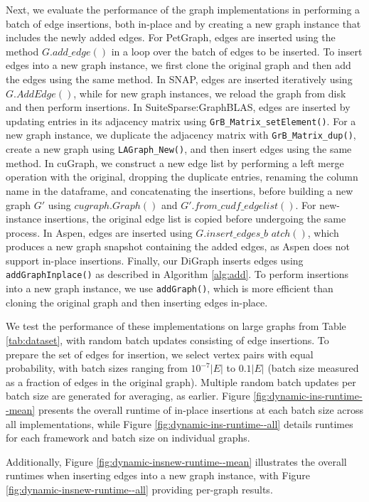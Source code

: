 Next, we evaluate the performance of the graph implementations in performing a batch of edge insertions, both in-place and by creating a new graph instance that includes the newly added edges. For PetGraph, edges are inserted using the method $G.add\_edge()$ in a loop over the batch of edges to be inserted. To insert edges into a new graph instance, we first clone the original graph and then add the edges using the same method. In SNAP, edges are inserted iteratively using $G.AddEdge()$, while for new graph instances, we reload the graph from disk and then perform insertions. In SuiteSparse:GraphBLAS, edges are inserted by updating entries in its adjacency matrix using \texttt{GrB\_Matrix\_setElement()}. For a new graph instance, we duplicate the adjacency matrix with \texttt{GrB\_Matrix\_dup()}, create a new graph using \texttt{LAGraph\_New()}, and then insert edges using the same method. In cuGraph, we construct a new edge list by performing a left merge operation with the original, dropping the duplicate entries, renaming the column name in the dataframe, and concatenating the insertions, before building a new graph $G'$ using $cugraph.Graph()$ and $G'.from\_cudf\_edgelist()$. For new-instance insertions, the original edge list is copied before undergoing the same process. In Aspen, edges are inserted using $G.insert\_edges\_b$ $atch()$, which produces a new graph snapshot containing the added edges, as Aspen does not support in-place insertions. Finally, our DiGraph inserts edges using \texttt{addGraphInplace()} as described in Algorithm \ref{alg:add}. To perform insertions into a new graph instance, we use \texttt{addGraph()}, which is more efficient than cloning the original graph and then inserting edges in-place.



We test the performance of these implementations on large graphs from Table \ref{tab:dataset}, with random batch updates consisting of edge insertions. To prepare the set of edges for insertion, we select vertex pairs with equal probability, with batch sizes ranging from $10^{-7} |E|$ to $0.1|E|$ (batch size measured as a fraction of edges in the original graph). Multiple random batch updates per batch size are generated for averaging, as earlier. Figure \ref{fig:dynamic-ins-runtime--mean} presents the overall runtime of in-place insertions at each batch size across all implementations, while Figure \ref{fig:dynamic-ins-runtime--all} details runtimes for each framework and batch size on individual graphs. Additionally, Figure \ref{fig:dynamic-insnew-runtime--mean} illustrates the overall runtimes when inserting edges into a new graph instance, with Figure \ref{fig:dynamic-insnew-runtime--all} providing per-graph results.

